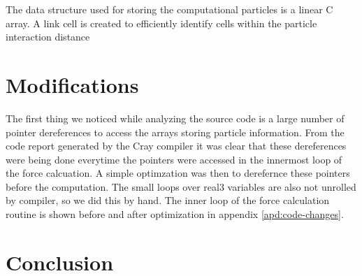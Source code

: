 \documentclass[12pt]{article}
\begin{document}
The data structure used for storing the computational particles is a linear C array.
A link cell is created to efficiently identify cells within the particle interaction distance 




\section{Modifications}
The first thing we noticed while analyzing the source code is a large
number of pointer dereferences to access the arrays storing particle
information. From the code report generated by the Cray compiler it
was clear that these dereferences were being done everytime the
pointers were accessed in the innermost loop of the force
calcuation. A simple optimzation was then to derefernce these pointers
before the computation. The small loops over real3 variables are also
not unrolled by compiler, so we did this by hand. The inner loop of
the force calculation routine is shown before and after optimization
in appendix \ref{apd:code-changes}.





\section{Conclusion}


\end{document}
